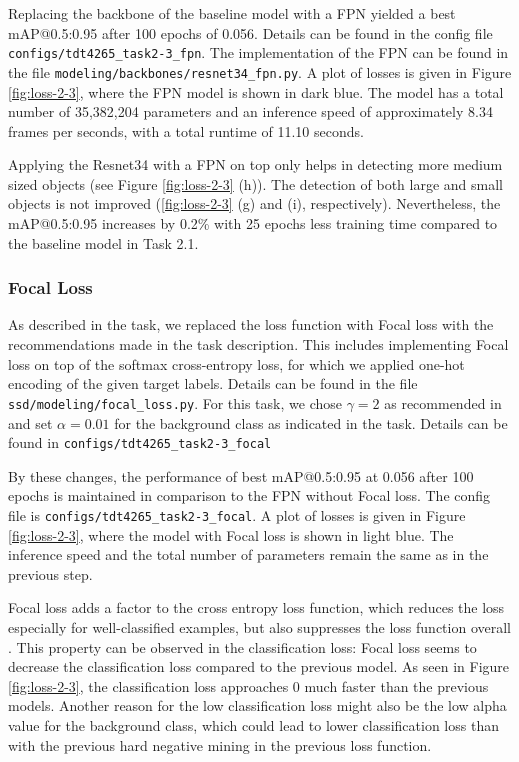 \documentclass{article}
\begin{document}
Replacing the backbone of the baseline model with a FPN yielded a best mAP@0.5:0.95 after 100 epochs of 0.056. Details can be found in the config file \texttt{configs/tdt4265\_task2-3\_fpn}.  The implementation of the FPN can be found in the file \texttt{modeling/backbones/resnet34\_fpn.py}.  A plot of losses is given in Figure \ref{fig:loss-2-3}, where the FPN model is shown in dark blue. The model has a total number of 35,382,204 parameters and an inference speed of approximately 8.34 frames per seconds, with a total runtime of 11.10 seconds.

Applying the Resnet34 with a FPN on top only helps in detecting more medium sized objects (see Figure \ref{fig:loss-2-3} (h)). The detection of both large and small objects is not improved (\ref{fig:loss-2-3} (g) and (i), respectively). Nevertheless, the mAP@0.5:0.95 increases by 0.2\% with 25 epochs less training time compared to the baseline model in Task 2.1.

\subsubsection*{Focal Loss}
As described in the task, we replaced the loss function with Focal loss \cite{lin2017focal} with the recommendations made in the task description. This includes implementing Focal loss on top of the softmax cross-entropy loss, for which we applied one-hot encoding of the given target labels. Details can be found in the file \texttt{ssd/modeling/focal\_loss.py}. For this task, we chose $\gamma = 2$ as recommended in \cite{lin2017focal} and set $\alpha = 0.01$ for the background class as indicated in the task. Details can be found in \texttt{configs/tdt4265\_task2-3\_focal}

By these changes, the performance of best mAP@0.5:0.95 at 0.056 after 100 epochs is maintained in comparison to the FPN without Focal loss. The config file is \texttt{configs/tdt4265\_task2-3\_focal}. A plot of losses is given in Figure \ref{fig:loss-2-3}, where the model with Focal loss is shown in light blue. The inference speed and the total number of parameters remain the same as in the previous step.

Focal loss adds a factor to the cross entropy loss function, which reduces the loss especially for well-classified examples, but also suppresses the loss function overall \cite{lin2017focal}. This property can be observed in the classification loss: Focal loss seems to decrease the classification loss compared to the previous model. As seen in Figure \ref{fig:loss-2-3}, the classification loss approaches 0 much faster than the previous models. Another reason for the low classification loss might also be the low alpha value for the background class, which could lead to lower classification loss than with the previous hard negative mining in the previous loss function. 
\end{document}
